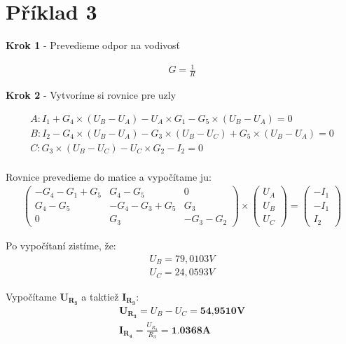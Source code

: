 \section{Příklad 3}

\begin{center}
    \textbf{Krok 1} - Prevedieme odpor na vodivosť
\end{center}

\begin{gather*}
    G = \frac{1}{R}
\end{gather*}

\begin{center}
    \textbf{Krok 2} - Vytvoríme si rovnice pre uzly
\end{center}
\begin{gather*}
    A: I_{1} + G_{4} \times (U_{B} - U_{A}) - U_{A} \times G_{1} - G_{5} \times (U_{B} - U_{A}) = 0\\
    B: I_{2} - G_{4} \times (U_{B} - U_{A}) - G_{3} \times (U_{B} - U_{C}) + G_{5} \times (U_{B} - U_{A}) = 0\\
    C: G_{3} \times (U_{B} - U_{C}) - U_{C} \times G_{2} - I_{2} = 0\\
\end{gather*}

Rovnice prevedieme do matice a vypočítame ju:
\begin{gather*}
    \begin{pmatrix}
        -G_{4} - G_{1} + G_{5} & G_{4} - G_{5} & 0 \\
        G_{4} - G_{5} & -G_{4} - G_{3} + G_{5} & G_{3} \\
        0 & G_{3} & -G_{3} - G_{2}
    \end{pmatrix}
    \times
    \begin{pmatrix}
        U_{A} \\
        U_{B} \\
        U_{C}
    \end{pmatrix}
    =
    \begin{pmatrix}
        -I_1 \\
        -I_1 \\
        I_2
    \end{pmatrix}
\end{gather*}

Po vypočítaní zistíme, že:
\begin{gather*}
    U_B = 79,0103V \\
    U_C = 24,0593V
\end{gather*}

Vypočítame $\boldsymbol{U_{R_3}}$ a taktiež $\boldsymbol{I_{R_3}}$:
\begin{gather*}
    \boldsymbol{U_{R_3}} = U_B - U_C = \textbf{54,9510V} \\
    \boldsymbol{I_{R_4}} = \frac{U_{R_3}}{R_3} = \textbf{1.0368A}
\end{gather*}